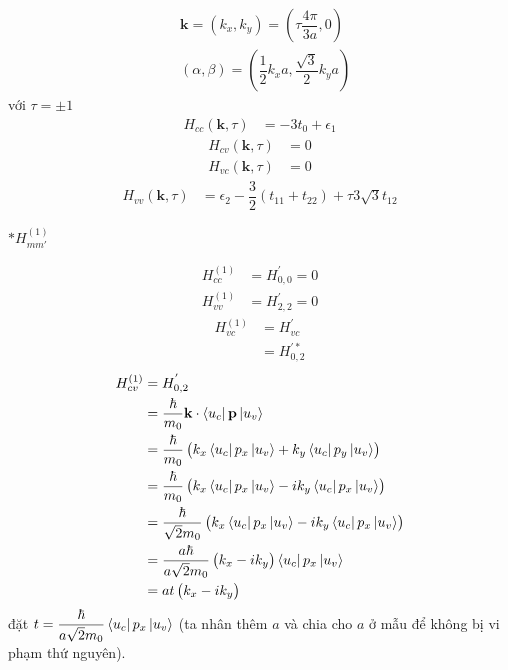 \documentclass{report}
\newcommand{\f}[2]{\dfrac{#1}{#2}}
\begin{document}
\begin{align*}
	 & \mathbf{k}  = (k_x,k_y) = \left(\tau\f{4\pi}{3a},0\right)                   \\
	 & (\alpha,\beta) = \left(\dfrac{1}{2} k_x a,\dfrac{\sqrt{3}}{2} k_y a \right)
\end{align*}
với $\tau = \pm 1$
\begin{align*}
	H_{cc}(\mathbf{k},\tau)
	 & =  -3t_0  + \epsilon_1
\end{align*}
\begin{align*}
	H_{cv}(\mathbf{k},\tau)
	 & = 0
\end{align*}
\begin{align*}
	H_{vc}(\mathbf{k},\tau)
	 & = 0
\end{align*}
\begin{align*}
	H_{vv}(\mathbf{k},\tau)
	 & =  \epsilon_2 - \f{3}{2} (t_{11} + t_{22}) + \tau 3\sqrt{3}t_{12}
\end{align*}

$\ast H^{(1)}_{mm'}$

\begin{align*}
	H^{(1)}_{cc}
	 & = H^{'}_{0,0} = 0
\end{align*}
\begin{align*}
	H^{(1)}_{vv}
	 & = H^{'}_{2,2} = 0
\end{align*}
\begin{align*}
	H^{(1)}_{vc}
	 & = H^{'}_{vc}      \\
	 & = H_{0,2}^{'\ast}
\end{align*}
\begin{align*}
	H^{(1)}_{cv}
	 & = H^{'}_{0,2}                                                                                       \\
	 & = \f{\hbar}{m_0} \mathbf{k}\cdot \bra{u_{c}}\mathbf{p}\ket{u_{v}}                                   \\
	 & = \f{\hbar}{m_0} \left(k_x \bra{u_{c}} p_x \ket{u_{v}} + k_y \bra{u_{c}} p_y \ket{u_{v}}\right)     \\
	 & = \f{\hbar}{m_0} \left( k_x \bra{u_c} p_x \ket{u_v} -i k_y \bra{u_c} p_x \ket{u_v} \right)          \\
	 & = \f{\hbar}{\sqrt{2}m_0} \left( k_x \bra{u_c} p_x \ket{u_v} - i k_y \bra{u_c} p_x \ket{u_v} \right) \\
	 & = \f{a\hbar}{a\sqrt{2}m_0} \left( k_x - i k_y \right)\bra{u_c} p_x \ket{u_v}                        \\
	 & = at \left( k_x - i k_y \right)
\end{align*}
đặt $t = \f{\hbar}{a\sqrt{2}m_0}\bra{u_c} p_x \ket{u_v}$
(ta nhân thêm $a$ và chia cho $a$ ở mẫu để không bị vi phạm thứ nguyên).\\
\end{document}
